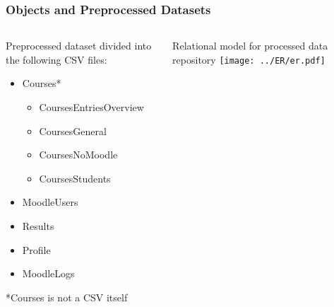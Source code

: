 \begin{frame}
\frametitle{Objects and Preprocessed Datasets}

\begin{columns}[T] %
\begin{column}{.48\textwidth}
    Preprocessed dataset divided into the following CSV files:

    \begin{itemize}
        \item Courses*

            \begin{itemize}
                \item CoursesEntriesOverview
                \item CoursesGeneral
                \item CoursesNoMoodle
                \item CoursesStudents
            \end{itemize}

        \item MoodleUsers
        \item Results
        \item Profile
        \item MoodleLogs
    \end{itemize}

    \tiny{*Courses is not a CSV itself}
\end{column}%
\hfill%
\begin{column}{.48\textwidth}
    Relational model for processed data repository
    \texttt{[image: ../ER/er.pdf]}
\end{column}%
\end{columns}
\end{frame}
